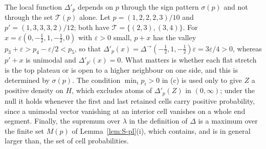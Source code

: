 \begin{remark}\label{rem:supp-statement}
The local function $\Delta'_p$ depends on $p$ through the sign pattern $\sigma(p)$ and not through the set $\mathcal T(p)$ alone. Let $p=(1,2,2,2,3)/10$ and $p'=(1,3,3,3,2)/12$; both have $\mathcal T=\{(2,3),(3,4)\}$. For $x=\varepsilon(0,-\tfrac12,1,-\tfrac12,0)$ with $\varepsilon>0$ small, $p+x$ has the valley $p_3+\varepsilon>p_4-\varepsilon/2<p_5$, so that $\Delta'_p(x)=\Delta^{\to}(-\tfrac12,1,-\tfrac12)\varepsilon=3\varepsilon/4>0$, whereas $p'+x$ is unimodal and $\Delta'_{p'}(x)=0$. What matters is whether each flat stretch is the top plateau or is open to a higher neighbour on one side, and this is determined by $\sigma(p)$. The condition $\min_ip_i>0$ in (c) is used only to give $Z$ a positive density on $H$, which excludes atoms of $\Delta'_p(Z)$ in $(0,\infty)$; under the null it holds whenever the first and last retained cells carry positive probability, since a unimodal vector vanishing at an interior cell vanishes on a whole end segment. Finally, the supremum over $\lambda$ in the definition of $\Delta$ is a maximum over the finite set $M(p)$ of Lemma~\ref{lem:S-pl}(i), which contains, and is in general larger than, the set of cell probabilities.
\end{remark}
